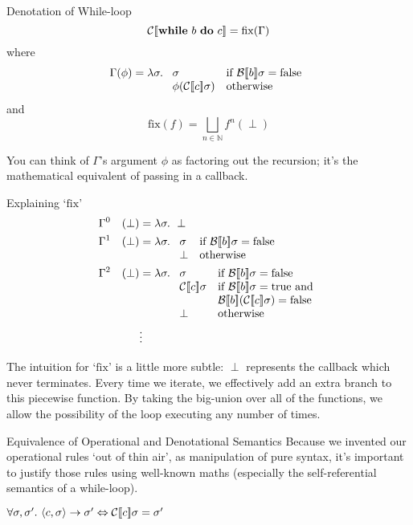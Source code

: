 \begin{frame}{Denotation of While-loop}
    \[\mathcal{C} [\![ \mathbf{while}\ b\ \mathbf{do}\ c ]\!] = \mathrm{fix}(\Gamma) \]
    where
    \[\Gamma(\phi) = \lambda \sigma.\ \begin{array}[t]{ll}
            \sigma & \text{if } \denB{b}\sigma = \mathrm{false} \\
            \phi(\denC{c}\sigma) & \text{otherwise}
    \end{array}\]
    and
    \[\mathrm{fix}(f) = \bigsqcup_{n \in \mathbb{N}}{f^n(\perp)}\]
\end{frame}

You can think of $\Gamma$'s argument $\phi$ as factoring out the recursion;
it's the mathematical equivalent of passing in a callback.

\begin{frame}{Explaining `$\mathrm{fix}$'}
    \begin{alignat*}{2}
        & \Gamma^0 &(\perp) &= \lambda \sigma.\ \perp \\
        & \Gamma^1 &(\perp) &= \lambda \sigma.\ \begin{array}[t]{ll}
                \sigma & \text{if } \denB{b}\sigma = \mathrm{false} \\
                \perp & \text{otherwise}
        \end{array} \\
        & \Gamma^2 &(\perp) &= \lambda \sigma.\ \begin{array}[t]{ll}
                \sigma & \text{if } \denB{b}\sigma = \mathrm{false} \\
                \denC{c}\sigma & \text{if } \denB{b}\sigma = \mathrm{true} \text{ and} \\
                            & \denB{b}(\denC{c}\sigma) = \mathrm{false} \\
                \perp & \text{otherwise}
        \end{array} \\
        & & & \vdots
    \end{alignat*}
\end{frame}

The intuition for `$\mathrm{fix}$' is a little more subtle: $\perp$
represents the callback which never terminates. Every time we iterate, we
effectively add an extra branch to this piecewise function. By taking the
big-union over all of the functions, we allow the possibility of the loop
executing any number of times.

\begin{frame}{Equivalence of Operational and Denotational Semantics}
    Because we invented our operational rules `out of thin air', as
    manipulation of pure syntax, it's important to justify those
    rules using well-known maths (especially the self-referential semantics of
    a while-loop).
    \begin{theorem}
        $\forall \sigma, \sigma'.\ \langle c, \sigma \rangle \rightarrow \sigma' \Leftrightarrow \mathcal{C} [\![ c ]\!]{\sigma} = \sigma'$
    \end{theorem}
\end{frame}

